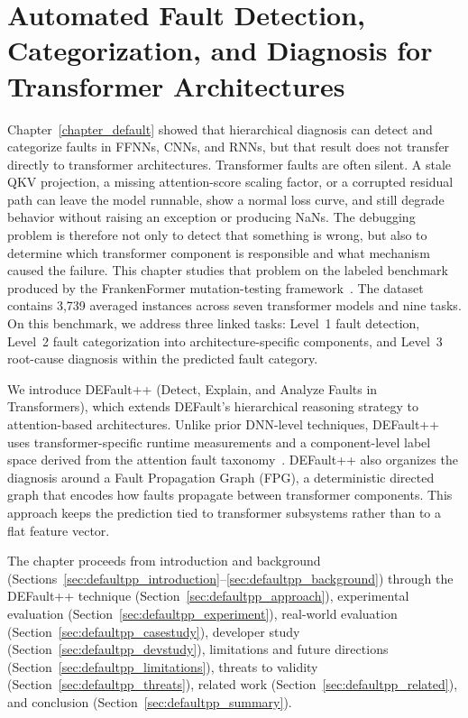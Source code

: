 \chapter{Automated Fault Detection, Categorization, and Diagnosis for Transformer Architectures}
\label{chapter_defaultpp}

Chapter~\ref{chapter_default} showed that hierarchical diagnosis can detect and categorize faults in FFNNs, CNNs, and RNNs, but that result does not transfer directly to transformer architectures. Transformer faults are often silent. A stale QKV projection, a missing attention-score scaling factor, or a corrupted residual path can leave the model runnable, show a normal loss curve, and still degrade behavior without raising an exception or producing NaNs. The debugging problem is therefore not only to detect that something is wrong, but also to determine which transformer component is responsible and what mechanism caused the failure. This chapter studies that problem on the labeled benchmark produced by the FrankenFormer mutation-testing framework~\cite{frankenformer}. The dataset contains 3{,}739 averaged instances across seven transformer models and nine tasks. On this benchmark, we address three linked tasks: Level~1 fault detection, Level~2 fault categorization into architecture-specific components, and Level~3 root-cause diagnosis within the predicted fault category.

We introduce DEFault++ (Detect, Explain, and Analyze Faults in Transformers), which extends DEFault's hierarchical reasoning strategy to attention-based architectures. Unlike prior DNN-level techniques, DEFault++ uses transformer-specific runtime measurements and a component-level label space derived from the attention fault taxonomy~\cite{attention_taxonomy}. DEFault++ also organizes the diagnosis around a Fault Propagation Graph (FPG), a deterministic directed graph that encodes how faults propagate between transformer components. This approach keeps the prediction tied to transformer subsystems rather than to a flat feature vector.

The chapter proceeds from introduction and background (Sections~\ref{sec:defaultpp_introduction}--\ref{sec:defaultpp_background}) through the DEFault++ technique (Section~\ref{sec:defaultpp_approach}), experimental evaluation (Section~\ref{sec:defaultpp_experiment}), real-world evaluation (Section~\ref{sec:defaultpp_casestudy}), developer study (Section~\ref{sec:defaultpp_devstudy}), limitations and future directions (Section~\ref{sec:defaultpp_limitations}), threats to validity (Section~\ref{sec:defaultpp_threats}), related work (Section~\ref{sec:defaultpp_related}), and conclusion (Section~\ref{sec:defaultpp_summary}).

